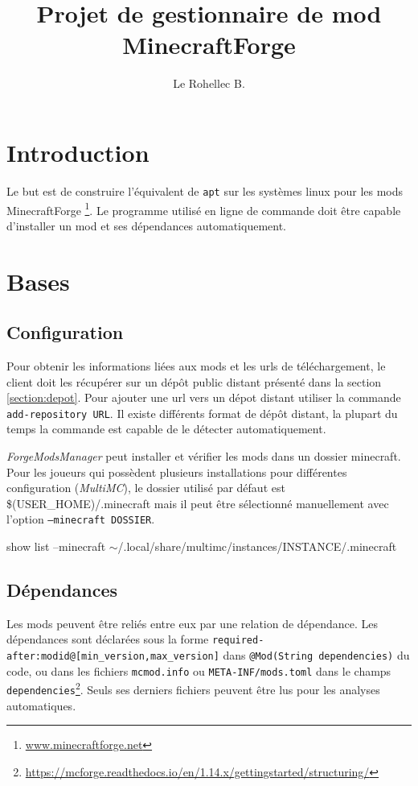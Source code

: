 \documentclass{article}
\title{Projet de gestionnaire de mod MinecraftForge}
\author{Le Rohellec B.}
\newenvironment{code}{%
\par
\vspace{3mm}
\ttfamily
}{%
\normalfont
\vspace{3mm}
\par
}
\begin{document}
\maketitle
\tableofcontents
\newpage


\section*{Introduction}
Le but est de construire l'équivalent de \texttt{apt} sur les systèmes linux pour les mods MinecraftForge \footnote{\url{www.minecraftforge.net}}.
Le programme utilisé en ligne de commande doit être capable d'installer un mod et ses dépendances automatiquement.

%
%
\section{Bases}
\label{section:bases}
\subsection{Configuration}
Pour obtenir les informations liées aux mods et les urls de téléchargement, le client doit les récupérer sur un dépôt public distant présenté dans la section \ref{section:depot}.
Pour ajouter une url vers un dépot distant utiliser la commande \texttt{add-repository URL}.
Il existe différents format de dépôt distant, la plupart du temps la commande est capable de le détecter automatiquement.

\textit{ForgeModsManager} peut installer et vérifier les mods dans un dossier minecraft.
Pour les joueurs qui possèdent plusieurs installations pour différentes configuration (\textit{MultiMC}), le dossier utilisé par défaut est \textsf{\$(USER\_HOME)/.minecraft} mais il peut être sélectionné manuellement avec l'option \texttt{--minecraft DOSSIER}.

\begin{code}
	show list --minecraft $\sim$/.local/share/multimc/instances/INSTANCE/.minecraft
\end{code}

\subsection{Dépendances}
Les mods peuvent être reliés entre eux par une relation de dépendance.
Les dépendances sont déclarées sous la forme \verb|required-after:modid@[min_version,max_version]| dans \verb|@Mod(String dependencies)| du code, ou dans les fichiers \texttt{mcmod.info} ou \texttt{META-INF/mods.toml} dans le champs \texttt{dependencies}\footnote{\url{https://mcforge.readthedocs.io/en/1.14.x/gettingstarted/structuring/}}.
Seuls ses derniers fichiers peuvent être lus pour les analyses automatiques.
\end{document}
